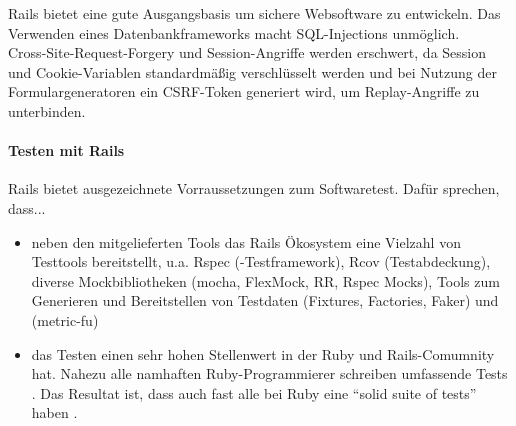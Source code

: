  Rails bietet eine gute Ausgangsbasis um sichere Websoftware zu entwickeln. Das Verwenden eines Datenbankframeworks macht SQL-Injections unmöglich. \\
Cross-Site-Request-Forgery und Session-Angriffe werden erschwert, da Session und Cookie-Variablen standardmäßig verschlüsselt werden und bei Nutzung der Formulargeneratoren ein CSRF-Token generiert wird, um Replay-Angriffe zu unterbinden.


\paragraph{Testen mit Rails}
Rails bietet ausgezeichnete Vorraussetzungen zum Softwaretest. Dafür sprechen, dass...

\begin{itemize}
 \item neben den mitgelieferten Tools das Rails Ökosystem eine Vielzahl von Testtools bereitstellt, u.a. Rspec (-Testframework), Rcov (Testabdeckung), diverse Mockbibliotheken (mocha, FlexMock, RR, Rspec Mocks), Tools zum Generieren und Bereitstellen von Testdaten (Fixtures, Factories, Faker) und  (metric-fu)
 \item das Testen einen sehr hohen Stellenwert in der Ruby und Rails-Comumnity hat. Nahezu alle namhaften Ruby-Programmierer schreiben umfassende Tests \citep{devries_rails_2008}. Das Resultat ist, dass auch fast alle  bei Ruby eine "`solid suite of tests"' haben \citep{devries_rails_2008}.
\end{itemize}

